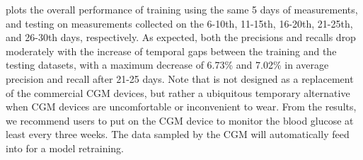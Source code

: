  plots the overall performance of training using the same 5 days of measurements, and testing on measurements collected on the 6-10th, 11-15th, 16-20th, 21-25th, and 26-30th days, respectively.
As expected, both the precisions and recalls drop moderately with the increase of temporal gaps between the training and the testing datasets, with a maximum decrease of 6.73\% and 7.02\% in average precision and recall after 21-25 days.
Note that \sysname is not designed as a replacement of the commercial CGM devices, but rather a ubiquitous temporary alternative when CGM devices are uncomfortable or inconvenient to wear.
From the results, we recommend \sysname users to put on the CGM device to monitor the blood glucose at least every three weeks.
The data sampled by the CGM will automatically feed into \sysname for a model retraining.




%
%

